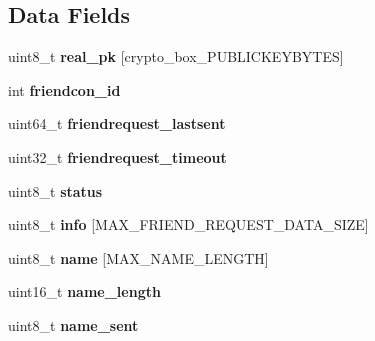 \subsection*{Data Fields}
\begin{DoxyCompactItemize}
\item 
\hypertarget{struct_friend_ab42b4c90d81ac99b968c3edd1e21d706}{uint8\+\_\+t {\bfseries real\+\_\+pk} \mbox{[}crypto\+\_\+box\+\_\+\+P\+U\+B\+L\+I\+C\+K\+E\+Y\+B\+Y\+T\+E\+S\mbox{]}}\label{struct_friend_ab42b4c90d81ac99b968c3edd1e21d706}

\item 
\hypertarget{struct_friend_aed1c0bb5aeba492059252d0084c8ae9b}{int {\bfseries friendcon\+\_\+id}}\label{struct_friend_aed1c0bb5aeba492059252d0084c8ae9b}

\item 
\hypertarget{struct_friend_a1cea2470caaf4282313efe944e95bf35}{uint64\+\_\+t {\bfseries friendrequest\+\_\+lastsent}}\label{struct_friend_a1cea2470caaf4282313efe944e95bf35}

\item 
\hypertarget{struct_friend_a671d1f4ab926cb9dc297c3f2743560d4}{uint32\+\_\+t {\bfseries friendrequest\+\_\+timeout}}\label{struct_friend_a671d1f4ab926cb9dc297c3f2743560d4}

\item 
\hypertarget{struct_friend_ade818037fd6c985038ff29656089758d}{uint8\+\_\+t {\bfseries status}}\label{struct_friend_ade818037fd6c985038ff29656089758d}

\item 
\hypertarget{struct_friend_ae1a1264e17ce4eedae67c283a09236e6}{uint8\+\_\+t {\bfseries info} \mbox{[}M\+A\+X\+\_\+\+F\+R\+I\+E\+N\+D\+\_\+\+R\+E\+Q\+U\+E\+S\+T\+\_\+\+D\+A\+T\+A\+\_\+\+S\+I\+Z\+E\mbox{]}}\label{struct_friend_ae1a1264e17ce4eedae67c283a09236e6}

\item 
\hypertarget{struct_friend_a11b8cc6595eea79e65c978209278e683}{uint8\+\_\+t {\bfseries name} \mbox{[}M\+A\+X\+\_\+\+N\+A\+M\+E\+\_\+\+L\+E\+N\+G\+T\+H\mbox{]}}\label{struct_friend_a11b8cc6595eea79e65c978209278e683}

\item 
\hypertarget{struct_friend_a3573d7a906b26e9999cd74f2c4066601}{uint16\+\_\+t {\bfseries name\+\_\+length}}\label{struct_friend_a3573d7a906b26e9999cd74f2c4066601}

\item 
\hypertarget{struct_friend_acc966be04e3e27e15dfd493c3e9cff89}{uint8\+\_\+t {\bfseries name\+\_\+sent}}\label{struct_friend_acc966be04e3e27e15dfd493c3e9cff89}


\end{DoxyCompactItemize}
